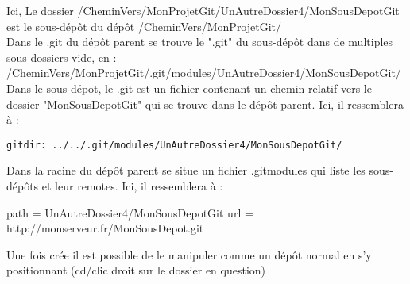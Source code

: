 Ici, Le dossier /CheminVers/MonProjetGit/UnAutreDossier4/MonSousDepotGit est le sous-dépôt du dépôt /CheminVers/MonProjetGit/\\

Dans le .git du dépôt parent se trouve le ".git" du sous-dépôt dans de multiples sous-dossiers vide, en : \\
/CheminVers/MonProjetGit/.git/modules/UnAutreDossier4/MonSousDepotGit/\\

Dans le sous dépot, le .git est un fichier contenant un chemin relatif vers le dossier "MonSousDepotGit" qui se trouve dans le dépôt parent. Ici, il ressemblera à :
\begin{verbatim}
gitdir: ../../.git/modules/UnAutreDossier4/MonSousDepotGit/
\end{verbatim}
\newpage
Dans la racine du dépôt parent se situe un fichier .gitmodules qui liste les sous-dépôts et leur remotes. Ici, il ressemblera à :
\begin{verbatimtab}
	path = UnAutreDossier4/MonSousDepotGit
	url = http://monserveur.fr/MonSousDepot.git
\end{verbatimtab}


Une fois crée il est possible de le manipuler comme un dépôt normal en s'y positionnant (cd/clic droit sur le dossier en question) 
